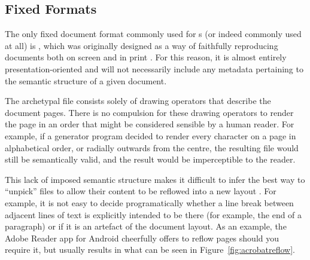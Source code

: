 \subsection{Fixed Formats}
\label{sec:fixedformats}
The only fixed document format commonly used for \ebook{}s (or indeed commonly used at all) is \pdf{},\hspace{0pt}\cite{ASI2001} which was originally designed as a way of faithfully reproducing documents both on screen and in print \cite{Warnock1991}. For this reason, it is almost entirely pre\-s\-en\-ta\-tion-oriented and will not necessarily include any metadata pertaining to the semantic structure of a given document.

The archetypal \pdf{} file consists solely of drawing operators that describe the document pages. There is no compulsion for these drawing operators to render the page in an order that might be considered sensible by a human reader. For example, if a \pdf{} generator program decided to render every character on a page in alphabetical order, or radially outwards from the centre, the resulting file would still be semantically valid, and the result would be imperceptible to the reader.

This lack of imposed semantic structure makes it difficult to infer the best way to ``unpick'' \pdf{} files to allow their content to be reflowed into a new layout \cite{Lovegrove1995, Bagley2005}. For example, it is not easy to decide programatically whether a line break between adjacent lines of text is explicitly intended to be there (for example, the end of a paragraph) or if it is an artefact of the document layout. As an example, the Adobe Reader app for Android cheerfully offers to reflow \pdf{} pages should you require it, but usually results in what can be seen in Figure~\ref{fig:acrobatreflow}.


